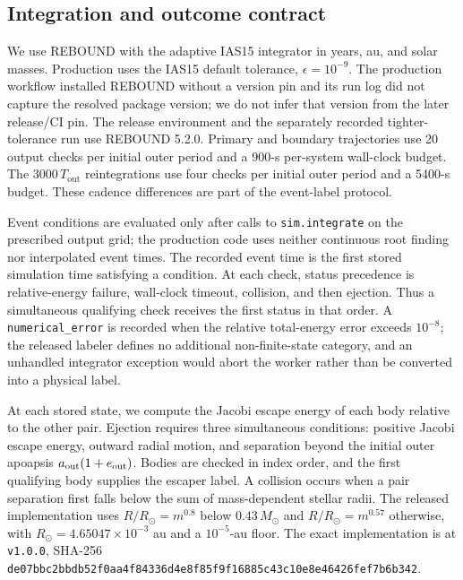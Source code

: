 \documentclass[linenumbers,twocolumn]{aastex702}
\newcommand{\Tout}{T_{\mathrm{out}}}
\begin{document}
\subsection{Integration and outcome contract}\label{sec:integration}

We use REBOUND \citep{ReinLiu2012} with the adaptive IAS15 integrator \citep{ReinSpiegel2015} in years, au, and solar masses. Production uses the IAS15 default tolerance, $\epsilon=10^{-9}$. The production workflow installed REBOUND without a version pin and its run log did not capture the resolved package version; we do not infer that version from the later release/CI pin. The release environment and the separately recorded tighter-tolerance run use REBOUND 5.2.0. Primary and boundary trajectories use 20 output checks per initial outer period and a 900-s per-system wall-clock budget. The $3000\,\Tout$ reintegrations use four checks per initial outer period and a 5400-s budget. These cadence differences are part of the event-label protocol.

Event conditions are evaluated only after calls to \texttt{sim.integrate} on the prescribed output grid; the production code uses neither continuous root finding nor interpolated event times. The recorded event time is the first stored simulation time satisfying a condition. At each check, status precedence is relative-energy failure, wall-clock timeout, collision, and then ejection. Thus a simultaneous qualifying check receives the first status in that order. A \texttt{numerical\_error} is recorded when the relative total-energy error exceeds $10^{-8}$; the released labeler defines no additional non-finite-state category, and an unhandled integrator exception would abort the worker rather than be converted into a physical label.

At each stored state, we compute the Jacobi escape energy of each body relative to the other pair. Ejection requires three simultaneous conditions: positive Jacobi escape energy, outward radial motion, and separation beyond the initial outer apoapsis $a_{\rm out}(1+e_{\rm out})$. Bodies are checked in index order, and the first qualifying body supplies the escaper label. A collision occurs when a pair separation first falls below the sum of mass-dependent stellar radii. The released implementation uses $R/R_\odot=m^{0.8}$ below $0.43\,M_\odot$ and $R/R_\odot=m^{0.57}$ otherwise, with $R_\odot=4.65047\times10^{-3}$ au and a $10^{-5}$-au floor. The exact implementation is  at \texttt{v1.0.0}, SHA-256 \texttt{de07bbc2bbdb52f0\allowbreak aa4f84336d4e8f85\allowbreak f9f16885c43c10e8\allowbreak e46426fef7b6b342}.
\end{document}
